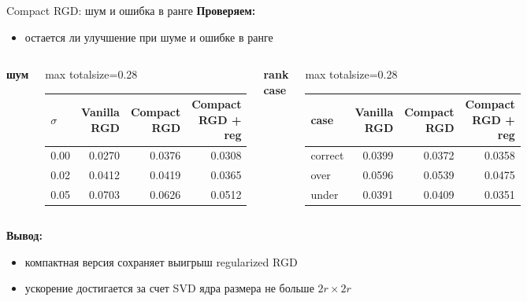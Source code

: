 \documentclass[aspectratio=169,xcolor=dvipsnames]{beamer}
\begin{document}
\begin{frame}{Compact RGD: шум и ошибка в ранге}
\scriptsize
\textbf{Проверяем:}
\begin{itemize}
\item остается ли улучшение при шуме и ошибке в ранге
\end{itemize}

\begin{columns}[T]
\centering
\textbf{шум}

\vspace{0.05cm}
\begin{adjustbox}{max totalsize={\linewidth}{0.28\textheight}}
\begin{tabular}{lrrr}
\toprule
$\sigma$ & Vanilla RGD & Compact RGD & Compact RGD + reg \\
\midrule
0.00 & 0.0270 & 0.0376 & \textcolor{green!50!black}{0.0308} \\
0.02 & 0.0412 & 0.0419 & \textcolor{green!50!black}{0.0365} \\
0.05 & 0.0703 & 0.0626 & \textcolor{green!50!black}{0.0512} \\
\bottomrule
\end{tabular}
\end{adjustbox}

\centering
\textbf{rank case}

\vspace{0.05cm}
\begin{adjustbox}{max totalsize={\linewidth}{0.28\textheight}}
\begin{tabular}{lrrr}
\toprule
case & Vanilla RGD & Compact RGD & Compact RGD + reg \\
\midrule
correct & 0.0399 & 0.0372 & \textcolor{green!50!black}{0.0358} \\
over & 0.0596 & 0.0539 & \textcolor{green!50!black}{0.0475} \\
under & 0.0391 & 0.0409 & \textcolor{green!50!black}{0.0351} \\
\bottomrule
\end{tabular}
\end{adjustbox}
\end{columns}

\textbf{Вывод:}
\begin{itemize}
\item компактная версия сохраняет выигрыш regularized RGD
\item ускорение достигается за счет SVD ядра размера не больше $2r\times 2r$
\end{itemize}
\end{frame}
\end{document}
